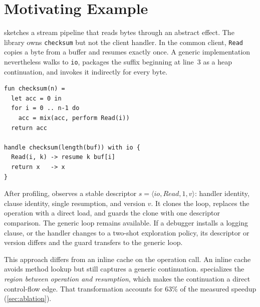 \section{Motivating Example}
\label{sec:motivation}

 sketches a stream pipeline that reads bytes through an
abstract effect. The library owns \lstinline|checksum| but not the client
handler. In the common client, \lstinline|Read| copies a byte from a buffer and
resumes exactly once. A generic implementation nevertheless walks to
\lstinline|io|, packages the suffix beginning at line~3 as a heap continuation,
and invokes it indirectly for every byte.

\begin{lstlisting}[float,caption={A separately compiled handler on a hot path.},label={lst:example}]
fun checksum(n) =
  let acc = 0 in
  for i = 0 .. n-1 do
    acc = mix(acc, perform Read(i))
  return acc

handle checksum(length(buf)) with io {
  Read(i, k) -> resume k buf[i]
  return x   -> x
}
\end{lstlisting}

After profiling, \system observes a stable descriptor
$s=\langle\textit{io},\textit{Read},1,v\rangle$: handler identity, clause
identity, single resumption, and version $v$. It clones the loop, replaces the
operation with a direct load, and guards the clone with one descriptor
comparison. The generic loop remains available. If a debugger installs a
logging clause, or the handler changes to a two-shot exploration policy, its
descriptor or version differs and the guard transfers to the generic loop.

This approach differs from an inline cache on the operation call. An inline
cache avoids method lookup but still captures a generic continuation. \system
specializes the \emph{region between operation and resumption}, which makes the
continuation a direct control-flow edge. That transformation accounts for 63\%
of the measured speedup (\cref{sec:ablation}).

